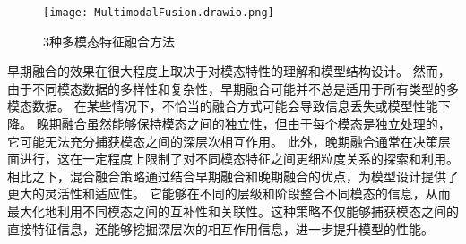 \begin{figure}[h]
	\centering
	\texttt{[image: MultimodalFusion.drawio.png]}
	\caption{3种多模态特征融合方法}
	\label{fig:MultimodalFusio}
\end{figure}


早期融合的效果在很大程度上取决于对模态特性的理解和模型结构设计。
然而，由于不同模态数据的多样性和复杂性，早期融合可能并不总是适用于所有类型的多模态数据。
在某些情况下，不恰当的融合方式可能会导致信息丢失或模型性能下降。
晚期融合虽然能够保持模态之间的独立性，但由于每个模态是独立处理的，它可能无法充分捕获模态之间的深层次相互作用。
此外，晚期融合通常在决策层面进行，这在一定程度上限制了对不同模态特征之间更细粒度关系的探索和利用。
相比之下，混合融合策略通过结合早期融合和晚期融合的优点，为模型设计提供了更大的灵活性和适应性。
它能够在不同的层级和阶段整合不同模态的信息，从而最大化地利用不同模态之间的互补性和关联性。这种策略不仅能够捕获模态之间的直接特征信息，还能够挖掘深层次的相互作用信息，进一步提升模型的性能。\par



